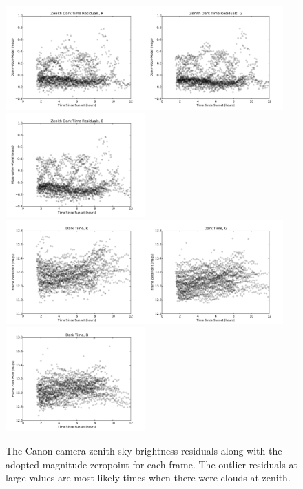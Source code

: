 \documentclass[]{spie}
\begin{document}
\begin{figure}[ht]
  \begin{center}
  \includegraphics[height=4cm]{plots/residTON_R.pdf}\includegraphics[height=4cm]{plots/residTON_G.pdf}\includegraphics[height=4cm]{plots/residTON_B.pdf} \\
  \includegraphics[height=4cm]{plots/zpTON_R.pdf}\includegraphics[height=4cm]{plots/zpTON_G.pdf}\includegraphics[height=4cm]{plots/zpTON_B.pdf}
  \end{center}
  \caption{The Canon camera zenith sky brightness residuals along with the adopted magnitude zeropoint for each frame. The outlier residuals at large values are most likely times when there were clouds at zenith.  \label{fig:timeOfNight}}
\end{figure}
\end{document}
